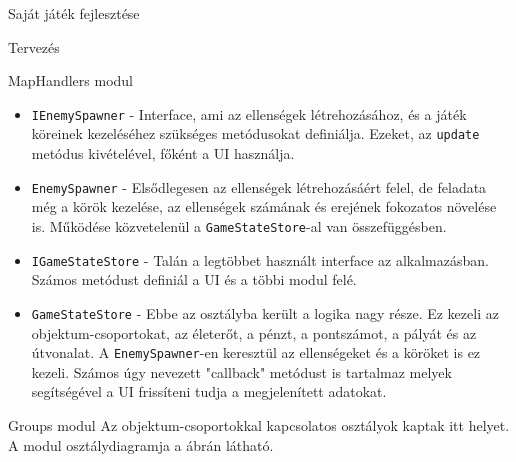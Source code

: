 \begin{MyChapter}{Saját játék fejlesztése}
\begin{MySection}{Tervezés}
\begin{MySubSection}{MapHandlers modul}
\begin{itemize}
				\item \texttt{IEnemySpawner} - Interface, ami az ellenségek létrehozásához, és a játék köreinek kezeléséhez szükséges metódusokat definiálja. Ezeket, az \texttt{update} metódus kivételével, főként a UI használja.
				
				\item \texttt{EnemySpawner} - Elsődlegesen az ellenségek létrehozásáért felel, de feladata még a körök kezelése, az ellenségek számának és erejének fokozatos növelése is. Működése közvetelenül a \texttt{GameStateStore}-al van összefüggésben.
				
				\item \texttt{IGameStateStore} - Talán a legtöbbet használt interface az alkalmazásban. Számos metódust definiál a UI és a többi modul felé.
				
				\item \texttt{GameStateStore} - Ebbe az osztályba került a logika nagy része. Ez kezeli az objektum-csoportokat, az életerőt, a pénzt, a pontszámot, a pályát és az útvonalat. A \texttt{EnemySpawner}-en keresztül az ellenségeket és a köröket is ez kezeli. Számos úgy nevezett "callback" metódust is tartalmaz melyek segítségével a UI frissíteni tudja a megjelenített adatokat.
			\end{itemize}
		\end{MySubSection}
	
		\begin{MySubSection}{Groups modul}
			Az objektum-csoportokkal kapcsolatos osztályok kaptak itt helyet.
			A modul osztálydiagramja a  ábrán látható.
	

\end{MySubSection}
\end{MySection}
\end{MyChapter}
